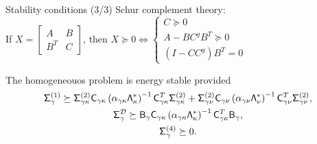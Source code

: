 \documentclass{beamer}
\begin{document}
\begin{frame}{Stability conditions (3/3)}
    Schur complement theory: \\
    \vskip 3mm
    \centering
    If $X = \begin{bmatrix}
    A & B \\ B^T & C
    \end{bmatrix}$, then $X\succeq 0 \iff \begin{cases}
    C \succeq 0 \\
    A-BC^gB^T\succeq 0 \\
    (I - CC^g)B^T=0
    \end{cases}$
    \vskip 5mm
    \begin{block}{}
        The homogeneouos problem is energy stable provided
       \begin{gather*}
       \mathsf{\Sigma}_{\gamma}^{(1)} \succeq \mathsf{\Sigma}_{\gamma\kappa}^{(2)} \mathsf{C}_{\gamma\kappa}
       \left(\alpha_{\gamma\kappa}\mathsf{\Lambda}_{\kappa}^{*}\right)^{-1}\mathsf{C}_{\gamma\kappa}^T \mathsf{\Sigma}_{\gamma\kappa}^{(2)}
       + \mathsf{\Sigma}_{\gamma\nu} ^{(2)} \mathsf{C}_{\gamma\nu} \left(\alpha_{\gamma\nu} \mathsf{\Lambda}_{\nu}^{*}\right)^{-1}\mathsf{C}_{\gamma\nu}^T \mathsf{\Sigma}_{\gamma\nu} ^{(2)}, \\
       \mathsf{\Sigma}_{\gamma}^{\mathcal{D}} \succeq \mathsf{B}_{\gamma} \mathsf{C}_{\gamma\kappa}
       \left(\alpha_{\gamma\kappa}\mathsf{\Lambda}_{\kappa}^{*}\right)^{-1}\mathsf{C}_{\gamma\kappa}^T \mathsf{B}_{\gamma} ,\\
       \mathsf{\Sigma}_{\gamma}^{(4)} \succeq 0.
       \end{gather*}
    \end{block}
\end{frame}
\end{document}
